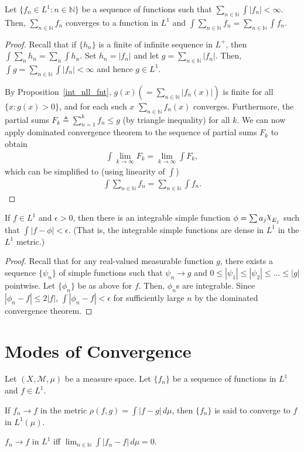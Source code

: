 \documentclass[a4paper,english,12pt]{article}
\newcommand{\goodchi}{\protect\raisebox{2.5pt}{$\chi$}}
\begin{document}
\begin{thm}Let $\{f_n\in L^1:n\in\mathbb{N}\}$ be a sequence of functions such that $\sum_{n\in\mathbb{N}}\int |f_n|<\infty$. Then, $\sum_{n\in\mathbb{N}}f_n$ converges to a function in $L^1$ and $\int \sum_{n\in\mathbb{N}}f_n =\sum_{n\in\mathbb{N}}\int f_n$.
\end{thm}
\begin{proof}Recall that if $\{h_n\}$ is a finite of infinite sequence in $L^+$, then $\int \sum_nh_n=\sum_n\int h_n$. Set $h_n=|f_n|$ and let $g=\sum_{n\in\mathbb{N}}|f_n|$. Then, $\int g=\sum_{n\in\mathbb{N}}\int |f_n|<\infty$ and hence $g\in L^1$. 

By Proposition~\ref{int_nll_fnt}, $g(x)(=\sum_{n\in\mathbb{N}}|f_n(x)|)$ is finite for all $\{x:g(x)>0\}$, and for each such $x$ $\sum_{n\in\mathbb{N}}f_n(x)$ converges. Furthermore, the partial sums $F_k\triangleq\sum_{n=1}^{k}f_n\leqslant g$ (by triangle inequality) for all $k$. We can now apply dominated convergence theorem to the sequence of partial sums $F_k$ to obtain
	\begin{align*}
		\int \lim_{k\rightarrow\infty} F_k=\lim_{k\rightarrow\infty}\int F_k,
	\end{align*}
which can be simplified to (using linearity of $\int$)
	\begin{align*}
		\int \sum_{n\in\mathbb{N}}f_n =\sum_{n\in\mathbb{N}}\int f_n.
	\end{align*}
\end{proof}

\begin{thm}If $f\in L^1$ and $\epsilon>0$, then there is an integrable simple function $\phi=\sum a_j\goodchi_{E_j}$ such that $\int |f-\phi|<\epsilon$. (That is, the integrable simple functions are dense in $L^1$ in the $L^1$ metric.)
\end{thm}
\begin{proof}Recall that for any real-valued measurable function $g$, there exists a sequence $\{\psi_n\}$ of simple functions such that $\psi_n\rightarrow g$ and $0\leqslant |\psi_1|\leqslant |\psi_2|\leqslant\ldots\leqslant |g|$ pointwise. Let $\{\phi_n\}$ be as above for $f$. Then, $\phi_n$s are integrable. Since $|\phi_n-f|\leqslant 2|f|$, $\int |\phi_n-f|<\epsilon$ for sufficiently large $n$ by the dominated convergence theorem.
\end{proof}

\section{Modes of Convergence}
Let $(X,\mathcal{M},\mu)$ be a measure space. Let $\{f_n\}$ be a sequence of functions in $L^1$ and $f\in L^1$.
\begin{defn}[Convergence in $L^1$] If $f_n\rightarrow f$ in the metric $\rho(f,g)=\int |f-g|\,d\mu$, then $\{f_n\}$ is said to converge to $f$ in $L^1(\mu)$.
\end{defn}
\begin{lem}$f_n\rightarrow f$ in $L^1$ iff $\lim_{n\in\mathbb{N}}\int |f_n-f|\,d\mu=0$.
\end{lem}
\end{document}
